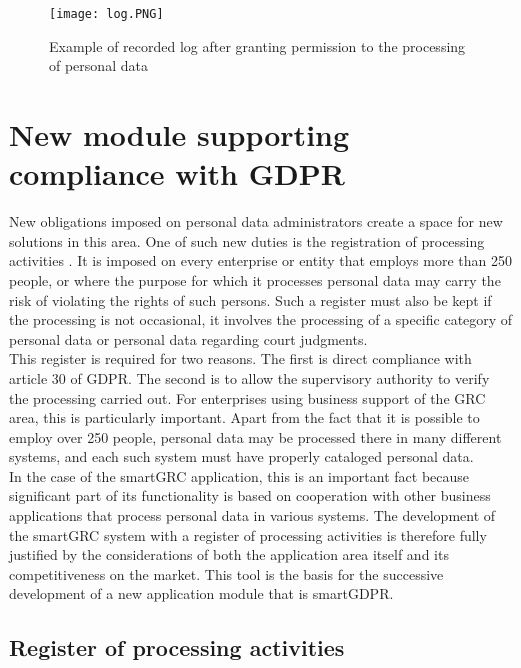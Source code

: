 \documentclass[en, noamssymb]{mgr}
\begin{document}
\begin{figure}[H]
	\centering
	\texttt{[image: log.PNG]}
	\caption[Example of recorded log after granting permission to the processing of personal data]{Example of recorded log after granting permission to the processing of personal data}
	\label{fig:Logs}
\end{figure}

\section{New module supporting compliance with GDPR}
 
New obligations imposed on personal data administrators create a space for new solutions in this area. One of such new duties is the registration of processing activities \cite{rodo_art30}. It is imposed on every enterprise or entity that employs more than 250 people, or where the purpose for which it processes personal data may carry the risk of violating the rights of such persons. Such a register must also be kept if the processing is not occasional, it involves the processing of a specific category of personal data or personal data regarding court judgments.\\
\indent This register is required for two reasons. The first is direct compliance with article 30 of GDPR. The second is to allow the supervisory authority to verify the processing carried out. For enterprises using business support of the GRC area, this is particularly important. Apart from the fact that it is possible to employ over 250 people, personal data may be processed there in many different systems, and each such system must have properly cataloged personal data.\\
\indent In the case of the smartGRC application, this is an important fact because significant part of its functionality is based on cooperation with other business applications that process personal data in various systems. The development of the smartGRC system with a register of processing activities is therefore fully justified by the considerations of both the application area itself and its competitiveness on the market. This tool is the basis for the successive development of a new application module that is smartGDPR.
 
\subsection{Register of processing activities}
\end{document}
